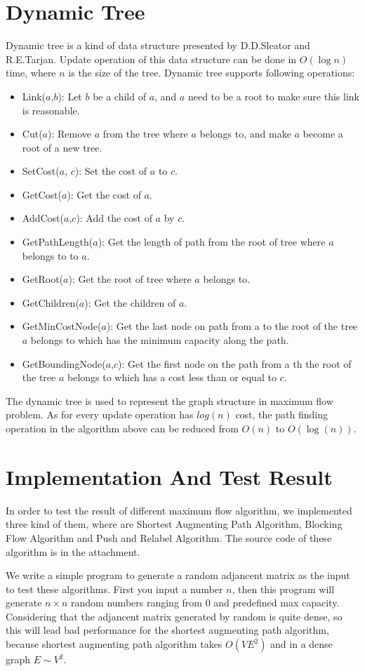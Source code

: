 \documentclass[twocolumn,9pt]{extarticle}
\begin{document}
\section{Dynamic Tree}
Dynamic tree is a kind of data structure presented by D.D.Sleator and R.E.Tarjan. Update operation of this data structure can be done in $O(\log{n})$ time, where $n$ is the size of the tree. Dynamic tree supports following operations:
\begin{itemize}
\item Link($a$,$b$): Let $b$ be a child of $a$, and $a$ need to be a root to make sure this link is reasonable.
\item Cut($a$): Remove $a$ from the tree where $a$ belongs to, and make $a$ become a root of a new tree.
\item SetCost($a$, $c$): Set the cost of $a$ to $c$.
\item GetCost($a$): Get the cost of $a$.
\item AddCost($a$,$c$): Add the cost of $a$ by $c$.
\item GetPathLength($a$): Get the length of path from the root of tree where $a$ belongs to to $a$.
\item GetRoot($a$): Get the root of tree where $a$ belongs to.
\item GetChildren($a$): Get the children of $a$.
\item GetMinCostNode($a$): Get the last node on path from a to the root of the tree $a$ belongs to which has the minimum capacity along the path.
\item GetBoundingNode($a$,$c$): Get the first node on the path from a th the root of the tree $a$ belongs to which has a cost less than or equal to $c$.
\end{itemize}
The dynamic tree is used to represent the graph structure in maximum flow problem. As for every update operation has $log(n)$ cost, the path finding operation in the algorithm above can be reduced from $O(n)$ to $O(\log(n))$.


\section{Implementation And Test Result}
In order to test the result of different maximum flow algorithm, we implemented three kind of them, where are Shortest Augmenting Path Algorithm, Blocking Flow Algorithm and Push and Relabel Algorithm. The source code of these algorithm is in the attachment.

We write a simple program to generate a random adjancent matrix as the input to test these algorithms. First you input a number $n$, then this program will generate $n\times n$ random numbers ranging from 0 and predefined max capacity. Considering that the adjancent matrix generated by random is quite dense, so this will lead bad performance for the shortest augmenting path algorithm, because shortest augmenting path algorithm takes $O(VE^2)$ and in a dense graph $E\sim V^2$.
\end{document}
